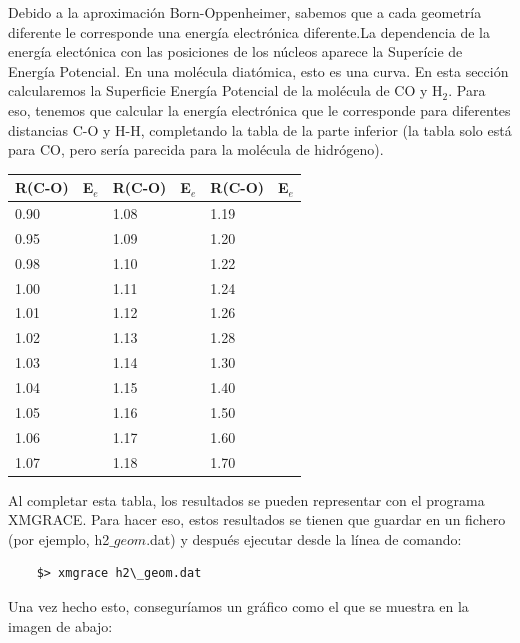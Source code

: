 \documentclass{tufte-book}
\begin{document}
Debido a la aproximación Born-Oppenheimer, sabemos que a cada geometría diferente le corresponde una energía electrónica diferente.La dependencia de la energía electónica con las posiciones de los núcleos aparece la Superície de Energía Potencial. En una molécula diatómica, esto es una curva. En esta sección calcularemos la Superficie Energía Potencial de la molécula de CO y H$_2$. Para eso, tenemos que calcular la energía electrónica que le corresponde para diferentes distancias C-O y H-H, completando la tabla de la parte inferior (la tabla solo está para CO, pero sería parecida para la molécula de hidrógeno).

\begin{table}[h!]
\centering
	\scriptsize
	\begin{tabular}{ll|ll|ll}
	\toprule
		R(C-O) & E$_e$ & R(C-O) & E$_e$ & R(C-O) & E$_e$ \\
		\hline
		0.90   &       & 1.08   &       & 1.19   &        \\
		0.95   &       & 1.09   &       & 1.20   &        \\
		0.98   &       & 1.10   &       & 1.22   &        \\
		1.00   &       & 1.11   &       & 1.24   &        \\
		1.01   &       & 1.12   &       & 1.26   &        \\
		1.02   &       & 1.13   &       & 1.28   &        \\
		1.03   &       & 1.14   &       & 1.30   &        \\
		1.04   &       & 1.15   &       & 1.40   &        \\
		1.05   &       & 1.16   &       & 1.50   &        \\
		1.06   &       & 1.17   &       & 1.60   &        \\
		1.07   &       & 1.18   &       & 1.70   &        \\
	\bottomrule	
    \end{tabular}
\end{table}

Al completar esta tabla, los resultados se pueden representar con el programa XMGRACE. Para hacer eso, estos resultados se tienen que guardar en un fichero (por ejemplo, h2$\_{geom}$.dat) y después ejecutar desde la línea de comando:

\begin{verbatim}
    $> xmgrace h2\_geom.dat
\end{verbatim}

Una vez hecho esto, conseguríamos un gráfico como el que se muestra en la imagen de abajo:
\end{document}
